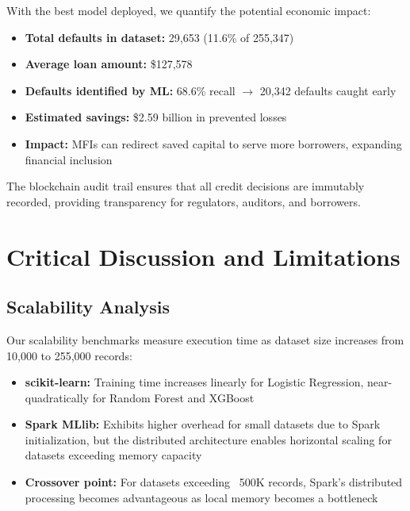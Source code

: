 \documentclass[preprint,12pt,authoryear]{elsarticle}
\begin{document}
With the best model deployed, we quantify the potential economic impact:

\begin{itemize}
    \item \textbf{Total defaults in dataset:} 29,653 (11.6\% of 255,347)
    \item \textbf{Average loan amount:} \$127,578
    \item \textbf{Defaults identified by ML:} 68.6\% recall $\rightarrow$ 20,342 defaults caught early
    \item \textbf{Estimated savings:} \$2.59 billion in prevented losses
    \item \textbf{Impact:} MFIs can redirect saved capital to serve more borrowers, expanding financial inclusion
\end{itemize}

The blockchain audit trail ensures that all credit decisions are immutably recorded, providing transparency for regulators, auditors, and borrowers.



\section{Critical Discussion and Limitations}
\label{sec:discussion}

\subsection{Scalability Analysis}

Our scalability benchmarks measure execution time as dataset size increases from 10,000 to 255,000 records:
\begin{itemize}
    \item \textbf{scikit-learn:} Training time increases linearly for Logistic Regression, near-quadratically for Random Forest and XGBoost
    \item \textbf{Spark MLlib:} Exhibits higher overhead for small datasets due to Spark initialization, but the distributed architecture enables horizontal scaling for datasets exceeding memory capacity
    \item \textbf{Crossover point:} For datasets exceeding ~500K records, Spark's distributed processing becomes advantageous as local memory becomes a bottleneck
\end{itemize}
\end{document}
